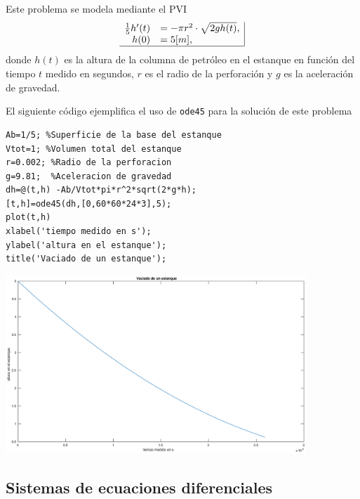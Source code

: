 \documentclass[letter,11pt]{article}
\begin{document}
Este problema se modela mediante el PVI
$$
\begin{array}{rl|}
\frac{1}{5}h'(t)	&= -\pi r^2\cdot \sqrt{2 g h(t)},\\
h(0)	&= 5[m], \\ \hline
\end{array}
$$
donde $h(t)$ es la altura de la columna de petr\'oleo en el estanque en funci\'on del tiempo $t$ medido en segundos, $r$ es el radio de la perforaci\'on y $g$ es la aceleraci\'on de gravedad.

El siguiente c\'odigo ejemplifica el uso de \texttt{ode45} para la soluci\'on de este problema
\begin{lstlisting}
Ab=1/5; %Superficie de la base del estanque
Vtot=1; %Volumen total del estanque
r=0.002; %Radio de la perforacion
g=9.81;  %Aceleracion de gravedad
dh=@(t,h) -Ab/Vtot*pi*r^2*sqrt(2*g*h);
[t,h]=ode45(dh,[0,60*60*24*3],5);
plot(t,h)
xlabel('tiempo medido en s');
ylabel('altura en el estanque');
title('Vaciado de un estanque');
\end{lstlisting}
\begin{center}
\includegraphics[width=0.85\textwidth]{eje3.eps}
\end{center}

\subsection{Sistemas de ecuaciones diferenciales}
\end{document}
